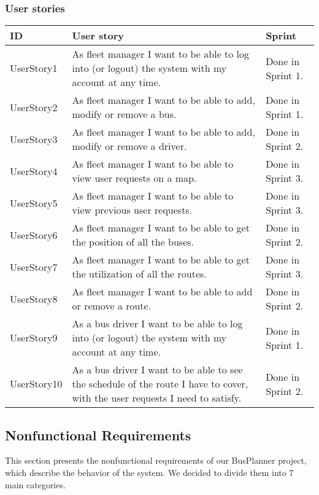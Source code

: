 \subsubsection{User stories}
\begin{table}[H]
	\centering
	\begin{tabular}{| m{2.2cm} | m{6cm} | m{3.8cm} |}
		\hline
		\textbf{ID} & \textbf{User story} & \textbf{Sprint} \\
		\hline
		UserStory1 & As fleet manager I want to be able to log into (or logout) the system with my account at any time. & Done in Sprint 1.\\
		\hline
		UserStory2 & As fleet manager I want to be able to add, modify or remove a bus. & Done in Sprint 1.\\
		\hline
		UserStory3 & As fleet manager I want to be able to add, modify or remove a driver. & Done in Sprint 2.\\
		\hline
		UserStory4 & As fleet manager I want to be able to view user requests on a map. & Done in Sprint 3.\\
		\hline
		UserStory5 & As fleet manager I want to be able to view previous user requests. & Done in Sprint 3.\\
		\hline
		UserStory6 & As fleet manager I want to be able to get the position of all the buses. & Done in Sprint 2.\\
		\hline
		UserStory7 & As fleet manager I want to be able to get the utilization of all the routes. & Done in Sprint 3.\\
		\hline
		UserStory8 & As fleet manager I want to be able to add or remove a route. & Done in Sprint 2.\\
		\hline
		UserStory9 & As a bus driver I want to be able to log into (or logout) the system with my account at any time. & Done in Sprint 1.\\
		\hline
		UserStory10 & As a bus driver I want to be able to see the schedule of the route I have to cover, with the user requests I need to satisfy. & Done in Sprint 2.\\
		\hline
	\end{tabular}
\end{table}
\newpage
\subsection{Nonfunctional Requirements}
This section presents the nonfunctional requirements of our BusPlanner project, which describe the behavior of the system. We decided to divide them into 7 main categories.
